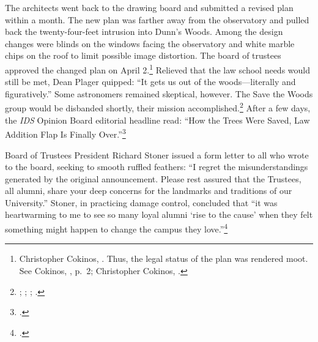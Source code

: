 \documentclass[
  american,
  letterpaper,
]{scrreprt}
\begin{document}
The architects went back to the drawing board and submitted a revised
plan within a month. The new plan was farther away from the observatory
and pulled back the twenty-four-feet intrusion into Dunn's Woods. Among
the design changes were blinds on the windows facing the observatory and
white marble chips on the roof to limit possible image distortion. The
board of trustees approved the changed plan on April 2.\footnote{Christopher
  Cokinos, . Thus, the
  legal status of the plan was rendered moot. See Cokinos,
  , p.~2; Christopher Cokinos,
  .} Relieved that the law
school needs would still be met, Dean Plager quipped: ``It gets us out
of the woods---literally and figuratively.'' Some astronomers remained
skeptical, however. The Save the Woods group would be disbanded shortly,
their mission accomplished.\footnote{;
  ;
  ;
  .} After a few days, the \emph{IDS} Opinion Board editorial
headline read: ``How the Trees Were Saved, Law Addition Flap Is Finally
Over.''\footnote{.}

Board of Trustees President Richard Stoner issued a form letter to all
who wrote to the board, seeking to smooth ruffled feathers: ``I regret
the misunderstandings generated by the original announcement. Please
rest assured that the Trustees, all alumni, share your deep concerns for
the landmarks and traditions of our University.'' Stoner, in practicing
damage control, concluded that ``it was heartwarming to me to see so
many loyal alumni `rise to the cause' when they felt something might
happen to change the campus they love.''\footnote{.}
\end{document}
